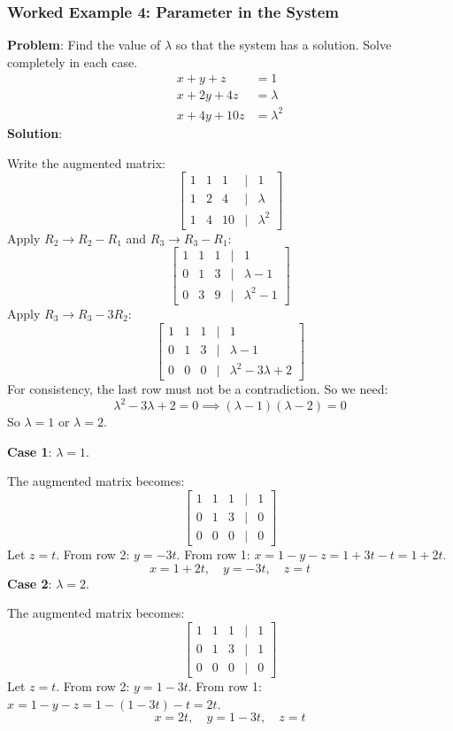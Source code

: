 \documentclass[
]{article}
\begin{document}
\subsubsection{Worked Example 4: Parameter in the
System}\label{worked-example-4-parameter-in-the-system}

\textbf{Problem}: Find the value of \(\lambda\) so that the system has a
solution. Solve completely in each case.
\[
\begin{aligned}
x + y + z &= 1 \\
x + 2y + 4z &= \lambda \\
x + 4y + 10z &= \lambda^2
\end{aligned}
\]
\textbf{Solution}:

Write the augmented matrix:
\[
\begin{bmatrix}
1 & 1 & 1 & | & 1 \\
1 & 2 & 4 & | & \lambda \\
1 & 4 & 10 & | & \lambda^2
\end{bmatrix}
\]
Apply \(R_2 \to R_2 - R_1\) and \(R_3 \to R_3 - R_1\):
\[
\begin{bmatrix}
1 & 1 & 1 & | & 1 \\
0 & 1 & 3 & | & \lambda - 1 \\
0 & 3 & 9 & | & \lambda^2 - 1
\end{bmatrix}
\]
Apply \(R_3 \to R_3 - 3R_2\):
\[
\begin{bmatrix}
1 & 1 & 1 & | & 1 \\
0 & 1 & 3 & | & \lambda - 1 \\
0 & 0 & 0 & | & \lambda^2 - 3\lambda + 2
\end{bmatrix}
\]
For consistency, the last row must not be a contradiction. So we need:
\[
\lambda^2 - 3\lambda + 2 = 0 \implies (\lambda - 1)(\lambda - 2) = 0
\]
So \(\lambda = 1\) or \(\lambda = 2\).

\textbf{Case 1}: \(\lambda = 1\).

The augmented matrix becomes:
\[
\begin{bmatrix}
1 & 1 & 1 & | & 1 \\
0 & 1 & 3 & | & 0 \\
0 & 0 & 0 & | & 0
\end{bmatrix}
\]
Let \(z = t\). From row 2: \(y = -3t\). From row 1:
\(x = 1 - y - z = 1 + 3t - t = 1 + 2t\).
\[
x = 1 + 2t, \quad y = -3t, \quad z = t
\]
\textbf{Case 2}: \(\lambda = 2\).

The augmented matrix becomes:
\[
\begin{bmatrix}
1 & 1 & 1 & | & 1 \\
0 & 1 & 3 & | & 1 \\
0 & 0 & 0 & | & 0
\end{bmatrix}
\]
Let \(z = t\). From row 2: \(y = 1 - 3t\). From row 1:
\(x = 1 - y - z = 1 - (1 - 3t) - t = 2t\).
\[
x = 2t, \quad y = 1 - 3t, \quad z = t
\]
\end{document}

